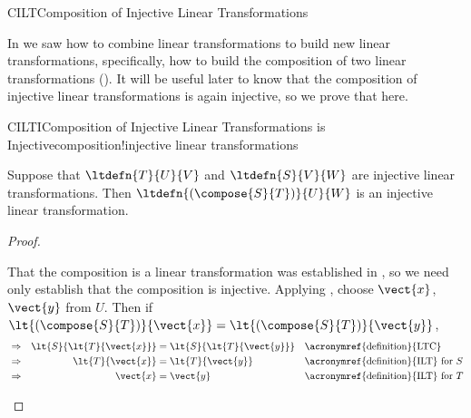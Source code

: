 %
\begin{subsect}{CILT}{Composition of Injective Linear Transformations}
%
\begin{para}In  we saw how to combine linear transformations to build new linear transformations, specifically, how to build the composition of two linear transformations ().  It will be useful later to know that the composition of injective linear transformations is again injective, so we prove that here.\end{para}
%
\begin{theorem}{CILTI}{Composition of Injective Linear Transformations is Injective}{composition!injective linear transformations}
\begin{para}Suppose that $\ltdefn{T}{U}{V}$ and $\ltdefn{S}{V}{W}$ are injective linear transformations.  Then $\ltdefn{(\compose{S}{T})}{U}{W}$ is an injective linear transformation.\end{para}
\end{theorem}
%
\begin{proof}
\begin{para}That the composition is a linear transformation was established in , so we need only establish that the composition is injective.  Applying , choose $\vect{x}$, $\vect{y}$ from $U$.  Then if $\lt{\left(\compose{S}{T}\right)}{\vect{x}}=\lt{\left(\compose{S}{T}\right)}{\vect{y}}$,
%
\begin{align*}
%
&\Rightarrow&\lt{S}{\lt{T}{\vect{x}}}&=\lt{S}{\lt{T}{\vect{y}}}
&&\text{\acronymref{definition}{LTC}}\\
%
&\Rightarrow&\lt{T}{\vect{x}}&=\lt{T}{\vect{y}}
&&\text{\acronymref{definition}{ILT} for $S$}\\
%
&\Rightarrow&\vect{x}&=\vect{y}
&&\text{\acronymref{definition}{ILT} for $T$}
\end{align*}
\end{para}
%
\end{proof}
%
%
\end{subsect}
%
